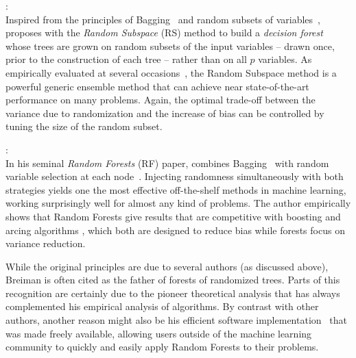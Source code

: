 \begin{description}
\item \citet{ho:1998}: \hfill \\
    Inspired from the principles of Bagging~\citep{breiman:1996b} and
    random subsets of variables~\citep{amit:1997}, \citet{ho:1998} proposes
    with the \textit{Random Subspace} (RS) method to build a \textit{decision
    forest} whose trees are grown on random subsets of the input variables
    -- drawn once, prior to the construction of each tree -- rather than on all $p$
    variables. As empirically evaluated at several
    occasions~\citep{ho:1998,panov:2007,louppe:2012}, the Random Subspace
    method is a powerful generic ensemble method that can achieve near state-of-the-art
    performance on many problems. Again, the optimal trade-off between the
    variance due to randomization  and the increase of bias can be controlled
    by tuning the size of the random subset.

\item \citet{breiman:2001}: \hfill \\
    In his seminal \textit{Random Forests} (RF) paper, \citet{breiman:2001} combines
    Bagging~\citep{breiman:1996b} with random variable selection at each
    node~\citep{amit:1997}. Injecting randomness simultaneously with both strategies  yields
    one the most effective off-the-shelf methods in machine learning, working
    surprisingly well for almost any kind of problems. The author empirically
    shows that Random Forests give results that are competitive with
    boosting \citep{freund:1995} and arcing algorithms \citep{breiman:1996},
    which both are designed to reduce bias while forests focus on variance
    reduction.

    While the original principles are due to several authors (as discussed
    above), Breiman is often cited as the father of forests of randomized trees. Parts of
    this recognition are certainly due to the pioneer theoretical analysis that
    has always complemented his empirical analysis of algorithms. By contrast
    with other authors, another reason might also be his efficient software
    implementation~\citep{breiman:2002} that was made freely available,
    allowing users outside of the machine learning community to quickly and
    easily apply Random Forests to their problems.


\end{description}
